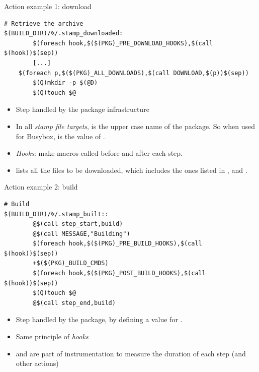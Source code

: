 \begin{frame}[fragile]{Action example 1: download}

\begin{block}{}
\begin{verbatim}
# Retrieve the archive
$(BUILD_DIR)/%/.stamp_downloaded:
        $(foreach hook,$($(PKG)_PRE_DOWNLOAD_HOOKS),$(call $(hook))$(sep))
        [...]
	$(foreach p,$($(PKG)_ALL_DOWNLOADS),$(call DOWNLOAD,$(p))$(sep))
        $(Q)mkdir -p $(@D)
        $(Q)touch $@
\end{verbatim}
\end{block}

\begin{itemize}
\item Step handled by the package infrastructure
\item In all {\em stamp file targets},  is the upper case
  name of the package. So when used for Busybox,
   is the value of .
\item {\em Hooks}: make macros called before and after each step.
\item {} lists all the files to be downloaded,
  which includes the ones listed in ,
   and .
\end{itemize}

\end{frame}

\begin{frame}[fragile]{Action example 2: build}

\begin{block}{}
\begin{verbatim}
# Build
$(BUILD_DIR)/%/.stamp_built::
        @$(call step_start,build)
        @$(call MESSAGE,"Building")
        $(foreach hook,$($(PKG)_PRE_BUILD_HOOKS),$(call $(hook))$(sep))
        +$($(PKG)_BUILD_CMDS)
        $(foreach hook,$($(PKG)_POST_BUILD_HOOKS),$(call $(hook))$(sep))
        $(Q)touch $@
        @$(call step_end,build)
\end{verbatim}
\end{block}

\begin{itemize}
\item Step handled by the package, by defining a value for
  .
\item Same principle of {\em hooks}
\item {} and  are part of
  instrumentation to measure the duration of each step (and other
  actions)
\end{itemize}

\end{frame}

